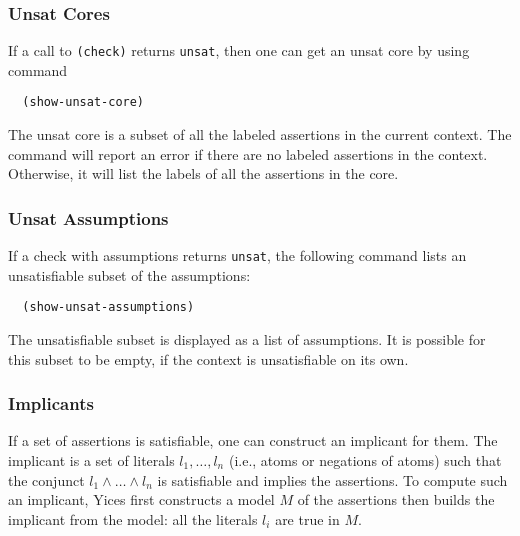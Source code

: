 \documentclass[11pt,twoside,fleqn,openright,titlepage]{cslreport}
\begin{document}
\subsubsection*{Unsat Cores}

If a call to \texttt{(check)} returns \texttt{unsat}, then one can get
an unsat core by using command
\begin{small}
\begin{verbatim}
  (show-unsat-core)
\end{verbatim}
\end{small}

\medskip\noindent
The unsat core is a subset of all the labeled assertions in the
current context. The command will report an error if there are no
labeled assertions in the context. Otherwise, it will list the labels
of all the assertions in the core.


\subsubsection*{Unsat Assumptions}

If a check with assumptions returns \texttt{unsat}, the following
command lists an unsatisfiable subset of the assumptions:
\begin{small}
\begin{verbatim}
  (show-unsat-assumptions)
\end{verbatim}
\end{small}

\medskip\noindent
The unsatisfiable subset is displayed as a list of assumptions. It is
possible for this subset to be empty, if the context is unsatisfiable
on its own.

\subsubsection*{Implicants}

If a set of assertions is satisfiable, one can construct an implicant
for them. The implicant is a set of literals $l_1,\ldots,l_n$ (i.e.,
atoms or negations of atoms) such that the conjunct $l_1 \wedge \ldots
\wedge l_n$ is satisfiable and implies the assertions. To compute such
an implicant, Yices first constructs a model $M$ of the assertions then
builds the implicant from the model: all the literals $l_i$ are
true in $M$.
\end{document}
